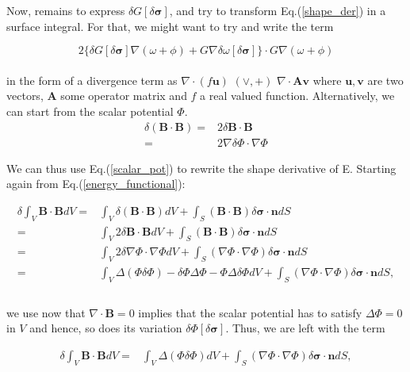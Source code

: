 \documentclass[aps,prc,floatfix,showkeys,nofootinbib]{revtex4-1}
\newcommand{\beq}{\begin{equation}}
\newcommand{\eeq}{\end{equation}}
\newcommand{\BB}{\textbf{B}}
\newcommand{\Div}{\nabla\cdot}
\newcommand{\grad}{\nabla}
\begin{document}
\noindent Now, remains to express $\delta G[\delta \bm{\sigma}]$, and try to transform Eq.(\ref{shape_der}) in a surface integral. For that, we might want to try and write the term 

\beq
2 \Big\{\delta G [ \delta \bm{\sigma}]\nabla(\omega + \phi) + G\nabla\delta \omega [\delta \bm{\sigma}]\Big\}\cdot G \nabla(\omega + \phi)
\eeq\\

\noindent in the form of a divergence term as $\Div (f\mathbf{u})$  $(\lor ,  +)$ $\Div \mathbf{A} \mathbf{v}$ where $\mathbf{u}, \mathbf{v}$ are two vectors, $\mathbf{A}$ some operator matrix and $f$ a real valued function. Alternatively, we can start from the scalar potential $\varPhi$. \\

\beq
\begin{split}
\delta(\mathbf{B}\cdot \mathbf{B}) =& 2 \delta \mathbf{B}\cdot \mathbf{B}\\
=&2 \grad \delta \varPhi \cdot \grad \varPhi 
\end{split}\label{scalar_pot}
\eeq

\noindent We can thus use Eq.(\ref{scalar_pot}) to rewrite the shape derivative of E. Starting again from Eq.(\ref{energy_functional}):

\beq
\begin{split}
\delta \int_V \mathbf{B}\cdot \mathbf{B} dV =& \int_V\delta(\BB \cdot \BB)dV + \int_S (\BB\cdot \BB) \delta \bm{\sigma}\cdot \mathbf{n} dS\\
=&  \int_V2\delta\BB \cdot \BB dV + \int_S (\BB\cdot \BB) \delta \bm{\sigma}\cdot \mathbf{n} dS\\
=&  \int_V2\delta\grad \varPhi\cdot \grad \varPhi dV + \int_S (\grad\varPhi\cdot \grad \varPhi) \delta \bm{\sigma}\cdot \mathbf{n} dS\\
=&  \int_V \Delta(\varPhi  \delta\varPhi) - \delta \varPhi \Delta \varPhi - \varPhi \Delta \delta \varPhi dV + \int_S (\grad\varPhi\cdot \grad \varPhi) \delta \bm{\sigma}\cdot \mathbf{n} dS,\\
\end{split}
\eeq\\

\noindent we use now that $\Div \BB = 0 $ implies that the scalar potential has to satisfy $\Delta \varPhi =0 $ in $V$ and hence, so does its variation $\delta \varPhi [\delta \bm{\sigma}]$. Thus, we are left with the term 

\beq
\begin{split}
\delta \int_V \mathbf{B}\cdot \mathbf{B} dV =& \int_V \Delta(\varPhi  \delta\varPhi)dV + \int_S (\grad\varPhi\cdot \grad \varPhi) \delta \bm{\sigma}\cdot \mathbf{n} dS,
\end{split}
\eeq\\
\end{document}
